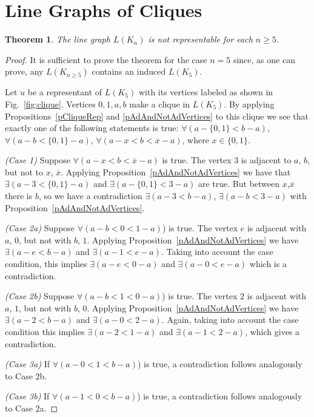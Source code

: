 \documentclass[12pt]{article}
\newtheorem{theorem}{Theorem}
\begin{document}
\section{Line Graphs of Cliques}\label{nonReprCliques}

\begin{theorem} The line graph $L(K_{n})$ is not representable for each $n \geqslant 5$.
\end{theorem}

\begin{proof} It is sufficient to prove the theorem for the case $n=5$ since, as one can prove, any $L(K_{n \geqslant 5})$ contains an induced $L(K_5)$.

Let $u$ be a representant of $L(K_{5})$ with its vertices labeled as shown in Fig.~\ref{fig:clique}.
Vertices $0,1,a,b$ make a clique in $L(K_{5})$. By applying Propositions~\ref{pCliqueRep} and \ref{pAdAndNotAdVertices} to this clique we see that exactly one of the following statements is true: $\forall (a-\{0,1\}<b-a)$, $\forall (a-b<\{0,1\}-a)$, $\forall (a-x<b<\overline{x}-a)$, where $x\in\{0,1\}$.

\textit{(Case 1)} Suppose $\forall (a-x<b<\overline{x}-a)$ is true. The vertex $3$ is adjacent to $a$, $b$, but not to $x$, $\overline{x}$. Applying Proposition~\ref{pAdAndNotAdVertices} we have that $\exists (a-3<\{0,1\}-a)$ and $\exists (a-\{0,1\}<3-a)$ are true. But between $x$,$\overline{x}$ there is $b$, so we have a contradiction $\exists (a-3<b-a)$, $\exists (a-b<3-a)$ with Proposition~\ref{pAdAndNotAdVertices}.

\textit{(Case 2a)} Suppose $\forall (a-b<0<1-a)$) is true. The vertex $e$ is adjacent with $a$, $0$, but not with $b$, $1$. Applying Proposition~\ref{pAdAndNotAdVertices} we have $\exists (a-e<b-a)$ and $\exists (a-1<e-a)$. Taking into account the case condition, this implies $\exists (a-e<0-a)$ and $\exists (a-0<e-a)$ which is a contradiction.

\textit{(Case 2b)} Suppose $\forall (a-b<1<0-a)$) is true. The vertex $2$ is adjacent with $a$, $1$, but not with $b$, $0$. Applying Proposition~\ref{pAdAndNotAdVertices} we have $\exists (a-2<b-a)$ and $\exists (a-0<2-a)$. Again, taking into account the case condition this implies $\exists (a-2<1-a)$ and $\exists (a-1<2-a)$, which gives a contradiction.

\textit{(Case 3a)} If $\forall (a-0<1<b-a)$) is true, a contradiction follows analogously to Case 2b.  

\textit{(Case 3b)} If $\forall (a-1<0<b-a)$) is true, a contradiction follows analogously to Case 2a.
\end{proof}
\end{document}
